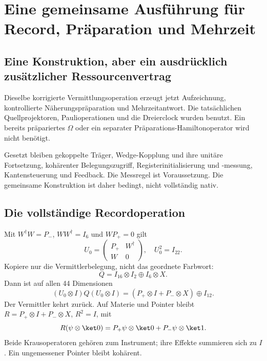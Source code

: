 \chapter{Eine gemeinsame Ausführung für Record, Präparation und Mehrzeit}
\label{ch:execution13}
\section{Eine Konstruktion, aber ein ausdrücklich zusätzlicher Ressourcenvertrag}
Dieselbe korrigierte Vermittlungsoperation erzeugt jetzt Aufzeichnung, kontrollierte Näherungspräparation und Mehrzeitantwort. Die tatsächlichen Quellprojektoren, Paulioperationen und die Dreierclock wurden benutzt. Ein bereits präpariertes $\Omega$ oder ein separater Präparations-Hamiltonoperator wird nicht benötigt.

Gesetzt bleiben gekoppelte Träger, Wedge-Kopplung und ihre unitäre Fortsetzung, kohärenter Belegungszugriff, Registerinitialisierung und -messung, Kantensteuerung und Feedback. Die Messregel ist Voraussetzung. Die gemeinsame Konstruktion ist daher bedingt, nicht vollständig nativ.

\section{Die vollständige Recordoperation}
Mit $W^\dagger W=P_-$, $WW^\dagger=I_6$ und $WP_+=0$ gilt
\begin{equation}
U_0=\begin{pmatrix}P_+&W^\dagger\\W&0\end{pmatrix},\quad U_0^2=I_{22}.
\end{equation}
Kopiere nur die Vermittlerbelegung, nicht das geordnete Farbwort:
\begin{equation}
Q=I_{16}\otimes I_2\oplus I_6\otimes X.
\end{equation}
Dann ist auf allen 44 Dimensionen
\begin{equation}
(U_0\otimes I)Q(U_0\otimes I)
=(P_+\otimes I+P_-\otimes X)\oplus I_{12}.
\end{equation}
Der Vermittler kehrt zurück. Auf Materie und Pointer bleibt $R=P_+\otimes I+P_-\otimes X$, $R^2=I$, mit
\begin{equation}
R(\psi\otimes\ket0)=P_+\psi\otimes\ket0+P_-\psi\otimes\ket1.
\end{equation}
Beide Krausoperatoren gehören zum Instrument; ihre Effekte summieren sich zu $I$. Ein ungemessener Pointer bleibt kohärent.

